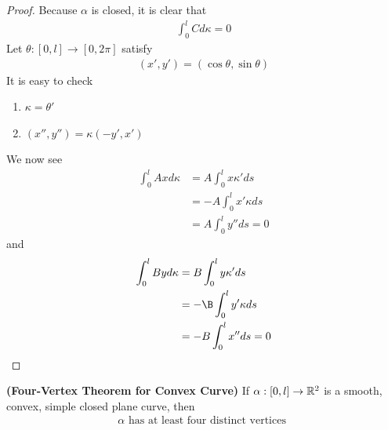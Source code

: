 \documentclass{report}
\begin{document}
\begin{proof}
Because $\alpha $ is closed, it is clear that 
\begin{align*}
\int_0^l Cd\kappa=0
\end{align*}
Let $\theta :[0,l]\rightarrow [0,2\pi]$ satisfy 
\begin{align*}
  (x',y')=(\cos \theta, \sin \theta)
\end{align*}
It is easy to check
\begin{enumerate}[label=(\alph*)]
  \item $\kappa=\theta'$
  \item $(x'',y'')=\kappa (-y', x')$
\end{enumerate}
We now see 
\begin{align*}
\int_0^l Axd\kappa&=A\int_0^l x\kappa' ds\\
&= -A\int_0^l x' \kappa ds \\
&=A\int_0^l y''ds=0
\end{align*}
and 
\begin{align*}
\int_0^l Byd\kappa&= B\int_0^l y\kappa' ds\\
&=-\B \int_0^l y'\kappa ds\\
&=-B \int_0^l x''ds=0
\end{align*}


\end{proof}
\begin{theorem}
\textbf{(Four-Vertex Theorem for Convex Curve)} If $\alpha :[0,l]\rightarrow \mathbb{R}^2$ is a smooth, convex, simple closed plane curve, then 
\begin{align*}
\alpha \text{ has at least four distinct vertices }
\end{align*}
\end{theorem}
\end{document}
